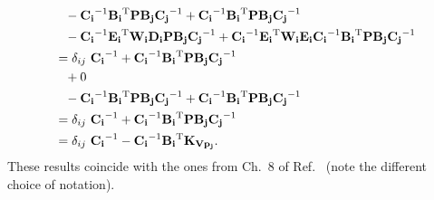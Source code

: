\documentclass[12pt,a4paper]{scrarticle}
\begin{document}
\begin{align*}
        &\hphantom{=}- \mathbf{C_{i}}^{-1} \mathbf{B_{i}}^{\mathrm{T}} \mathbf{P} \mathbf{B_{j}} \mathbf{C_{j}}^{-1} + \mathbf{C_{i}}^{-1} \mathbf{B_{i}}^{\mathrm{T}} \mathbf{P} \mathbf{B_{j}} \mathbf{C_{j}}^{-1} \\
        &\hphantom{=}- \mathbf{C_{i}}^{-1} \mathbf{E_{i}}^{\mathrm{T}} \mathbf{W_{i}} \mathbf{D_{i}} \mathbf{P} \mathbf{B_{j}} \mathbf{C_{j}}^{-1} + \mathbf{C_{i}}^{-1} \mathbf{E_{i}}^{\mathrm{T}} \mathbf{W_{i}} \mathbf{E_{i}} \mathbf{C_{i}}^{-1} \mathbf{B_{i}}^{\mathrm{T}} \mathbf{P} \mathbf{B_{j}} \mathbf{C_{j}}^{-1} \\
        &= \delta_{ij} \ \mathbf{C_{i}}^{-1} + \mathbf{C_{i}}^{-1} \mathbf{B_{i}}^{\mathrm{T}} \mathbf{P} \mathbf{B_{j}} \mathbf{C_{j}}^{-1} \\
        &\hphantom{=}+ 0 \\
        &\hphantom{=}- \mathbf{C_{i}}^{-1} \mathbf{B_{i}}^{\mathrm{T}} \mathbf{P} \mathbf{B_{j}} \mathbf{C_{j}}^{-1} + \mathbf{C_{i}}^{-1} \mathbf{B_{i}}^{\mathrm{T}} \mathbf{P} \mathbf{B_{j}} \mathbf{C_{j}}^{-1} \\
        &= \delta_{ij} \ \mathbf{C_{i}}^{-1} + \mathbf{C_{i}}^{-1} \mathbf{B_{i}}^{\mathrm{T}} \mathbf{P} \mathbf{B_{j}} \mathbf{C_{j}}^{-1} \\
        &= \delta_{ij} \ \mathbf{C_{i}}^{-1} - \mathbf{C_{i}}^{-1} \mathbf{B_{i}}^{\mathrm{T}} \mathbf{K}_{\mathbf{V} \mathbf{p_j}}.
\end{align*}
%
These results coincide with the ones from Ch.~8 of Ref.~\cite{fruhwirth2021pattern} (note the different choice of notation). 
%

\printbibliography{}
\end{document}
